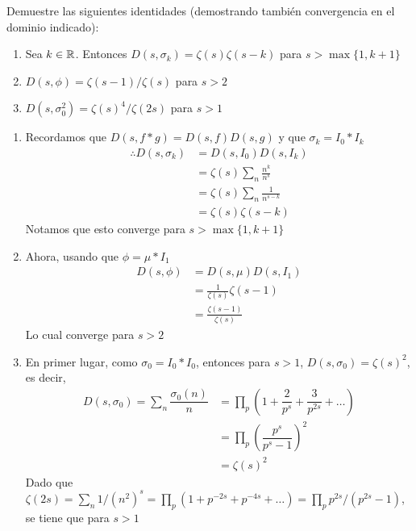 \begin{prob}[2 pts. c/u]
    Demuestre las siguientes identidades (demostrando también convergencia en el dominio indicado):
    \begin{enumerate}[label = (\roman*)]
        \item Sea $k\in\mathbb{R}$. Entonces $D(s,\sigma_k)=\zeta(s)\zeta(s-k)$ para $s>\max\{1,k+1\}$

        \item $D(s,\phi)=\zeta(s-1)/\zeta(s)$ para $s>2$

        \item $D(s,\sigma_0^2)=\zeta(s)^4/\zeta(2s)$ para $s>1$
    \end{enumerate}
\end{prob}
\begin{sol}
    \begin{enumerate}[label = (\roman*)]
        \item Recordamos que $D(s,f*g)=D(s,f)D(s,g)$ y que $\sigma_k=I_0*I_k$
        \begin{align*}
            \therefore D(s,\sigma_k)&=D(s,I_0)D(s,I_k)\\
            &=\zeta(s)\sum_n\frac{n^k}{n^s}\\
            &=\zeta(s)\sum_n\frac{1}{n^{s-k}}\\
            &=\zeta(s)\zeta(s-k)
        \end{align*}
        Notamos que esto converge para $s>\max\{1,k+1\}$

        \item Ahora, usando que $\phi=\mu*I_1$
        \begin{align*}
            D(s,\phi)&=D(s,\mu)D(s,I_1)\\
            &=\frac{1}{\zeta(s)}\zeta(s-1)\\
            &=\frac{\zeta(s-1)}{\zeta(s)}
        \end{align*}
        Lo cual converge para $s>2$

        \item En primer lugar, como $\sigma_0 = I_0 \ast I_0$, entonces para $s>1$, $D(s,\sigma_0) = \zeta(s)^2$, es decir,
        \begin{align*}
            D(s,\sigma_0) = \sum_n \dfrac{\sigma_0(n)}{n} &= \prod_p \left(1 + \dfrac{2}{p^s} + \dfrac{3}{p^{2s}} + \ldots\right)\\
            &= \prod_p \left(\dfrac{p^s}{p^s-1}\right)^2\\
            &= \zeta(s)^2
        \end{align*}
        Dado que $\zeta(2s) = \sum_n 1/(n^2)^s = \prod_p (1 + p^{-2s} + p^{-4s} + \ldots) = \prod_p p^{2s}/(p^{2s}-1)$, se tiene que para $s>1$


\end{enumerate}
\end{sol}
